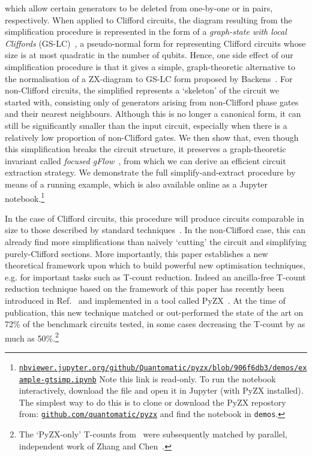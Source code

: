 \documentclass[a4paper,onecolumn,superscriptaddress,11pt,accepted=2020-04-27]{quantumarticle}
\theoremstyle{definition}
\begin{document}
which allow certain generators to be deleted from \zxdiagrams one-by-one or in pairs, respectively. When applied to Clifford circuits, the diagram resulting from the simplification procedure is represented in the form of a \emph{graph-state with local Cliffords} (GS-LC)~\cite{hein2006entanglement}, a pseudo-normal form for representing Clifford circuits whose size is at most quadratic in the number of qubits. Hence, one side effect of our simplification procedure is that it gives a simple, graph-theoretic alternative to the normalisation of a ZX-diagram to GS-LC form proposed by Backens~\cite{Backens1}. For non-Clifford circuits, the simplified \zxdiagram represents a `skeleton' of the circuit we started with, consisting only of generators arising from non-Clifford phase gates and their nearest neighbours. Although this is no longer a canonical form, it can still be significantly smaller than the input circuit, especially when there is a relatively low proportion of non-Clifford gates. We then show that, even though this simplification breaks the circuit structure, it preserves a graph-theoretic invariant called \textit{focused gFlow}~\cite{GFlow,mhalla2011graph}, from which we can derive an efficient circuit extraction strategy. We demonstrate the full simplify-and-extract procedure by means of a running example, which is also available online as a Jupyter notebook.\footnote{\href{https://nbviewer.jupyter.org/github/Quantomatic/pyzx/blob/906f6db3/demos/example-gtsimp.ipynb}{\color{blue!80!black}\texttt{nbviewer.jupyter.org/github/Quantomatic/pyzx/blob/906f6db3/demos/example-gtsimp.ipynb}} Note this link is read-only. To run the notebook interactively, download the file and open it in Jupyter (with PyZX installed). The simplest way to do this is to clone or download the PyZX repostory from: \href{https://github.com/quantomatic/pyzx}{\color{blue!80!black}\texttt{github.com/quantomatic/pyzx}} and find the notebook in \texttt{demos}.}

In the case of Clifford circuits, this procedure will produce circuits comparable in size to those described by standard techniques~\cite{aaronsongottesman2004,nest2010clifford}. In the non-Clifford case, this can already find more simplifications than na\"ively `cutting' the circuit and simplifying purely-Clifford sections. More importantly, this paper establishes a new theoretical framework upon which to build powerful new optimisation techniques, e.g. for important tasks such as T-count reduction. Indeed an ancilla-free T-count reduction technique based on the framework of this paper has recently been introduced in Ref.~\cite{zxtcount} and implemented in a tool called PyZX~\cite{pyzx}. At the time of publication, this new technique matched or out-performed the state of the art on 72\% of the benchmark circuits tested, in some cases decreasing the T-count by as much as 50\%.\footnote{The `PyZX-only' T-counts from~\cite{zxtcount} were subsequently matched by parallel, independent work of Zhang and Chen~\cite{zhang2019tgates}.}
\end{document}
